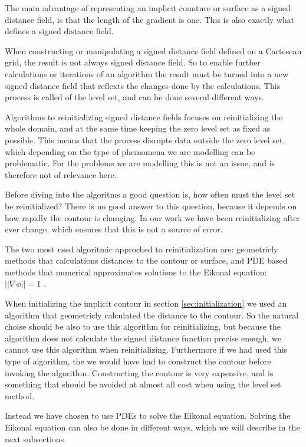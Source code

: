 
The main advantage of representing an implicit counture or surface as
a signed distance field, is that the length of the gradient is
one. This is also exactly what defines a signed distance field.

When constructing or manipulating a signed distance field defined on a
Cartesean grid, the result is not always signed distance field. So to
enable further calculations or iterations of an algorithm the result
must be turned into a new signed distance field that reflexts the
changes done by the calculations. This process is called
 of the level set, and can be done several
different ways.

Algorithms to reinitializing signed distance fields focuses on
reinitializing the whole domain, and at the same time keeping the zero
level set as fixed as possible. This means that the process disrupts
data outside the zero level set, which depending on the type of
phemomena we are modelling can be problematic. For the problems we are
modelling this is not an issue, and is therefore not of relevance here.

Before diving into the algoritms a good question is, how often must the
level set be reinitialized? There is no good answer to this question,
because it depends on how rapidly the contour is changing. In our work
we have been reinitializing after ever change, which ensures that this
is not a source of error.

The two most used algoritmic approched to reinitialization are:
geometricly methods that calculations distances to the contour or surface,
and PDE based methods that numerical approximates solutions to the Eikonal
equation: $||\nabla \phi|| = 1$ .

When initializing the implicit contour in section \vref{sec:initialization}
we used an algorithm that geometricly calculated the distance to the
contour. So the natural choise should be also to use this algorithm for
reinitializing, but because the algorithm does not calculate the
signed distance function precise enough, we cannot use this algorithm
when reinitializing. Furthermore if we had used this type of
algorithm, the we would have had to construct the contour before
invoking the algorithm. Constructing the contour is very expensive,
and is something that should be avoided at almost all cost when using
the level set method.

Instead we have chosen to use PDEs to solve the Eikonal
equation. Solving the Eikonal equation can also be done in different
ways, which we will describe in the next subsections.

